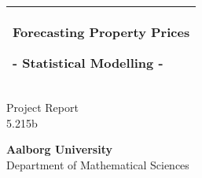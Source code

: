 %
\begin{titlepage}
  \addtolength{\hoffset}{0.5\evensidemargin-0.5\oddsidemargin} %
  \noindent%
  \begin{tabular}{@{}p{\textwidth}@{}}
    \toprule[2pt]
    \midrule
    \vspace{0.2cm}
    \begin{center}
    \Huge{\textbf{
      Forecasting Property Prices%
    }}
    \end{center}
    \begin{center}
      \Large{
        - Statistical Modelling -%
      }
    \end{center}
    \vspace{0.2cm}\\
    \midrule
    \toprule[2pt]
  \end{tabular}
  \vspace{4 cm}
  \begin{center}
    {\large
      Project Report%
    }\\
    \vspace{0.2cm}
    {\Large
      5.215b%
    }
  \end{center}
  \vfill
  \begin{center}
  {\Large \textbf{Aalborg University}}\\ \vspace{5pt}
  Department of Mathematical Sciences
  \end{center}
\end{titlepage}
\clearpage